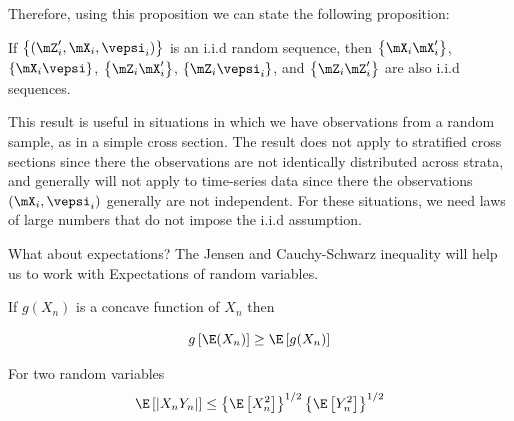 \documentclass[english,12pt]{book}\usepackage[]{graphicx}\usepackage[]{xcolor}
\begin{document}
Therefore, using this proposition we can state the following proposition:

\begin{proposition}\label{proposition:iid_transf}
	If $\left\{(\mZ'_i,\mX_i,\vepsi_i)\right\}$ is an i.i.d random sequence, then $\left\{\mX_i\mX_i'\right\}$, $\left\{\mX_i\vepsi\right\}$, $\left\{\mZ_i\mX_i'\right\}$, $\left\{\mZ_i\vepsi_i\right\}$, and $\left\{\mZ_i\mZ_i'\right\}$ are also i.i.d sequences. 
\end{proposition}

This result is useful in situations in which we have observations from a random sample, as in a simple cross section. The result does not apply to stratified cross sections since there the observations are not identically distributed across strata, and generally will not apply to time-series data since there the observations $(\mX_i, \vepsi_i)$ generally are not independent. For these situations, we need laws of large numbers that do not  impose the i.i.d assumption.

What about expectations? The Jensen and Cauchy-Schwarz inequality will help us to work with Expectations of random variables. 

\begin{theorem}\label{theorem:Jansen-Inequality}
If $g(X_n)$ is a concave function of $X_n$ then

\begin{equation*}
  g\left[\E(X_n)\right] \geq \E\left[g(X_n)\right]
\end{equation*}
\end{theorem}

\begin{theorem}\label{theorem:Cauchy-Inequality}
For two random variables
\begin{equation*}
  \E\left[\left|X_nY_n\right|\right]\leq \left\lbrace \E\left[X_n^2\right]\right\rbrace^{1/2} \left\lbrace \E\left[Y_n^2\right]\right\rbrace^{1/2} 
\end{equation*}
\end{theorem}



\end{document}
